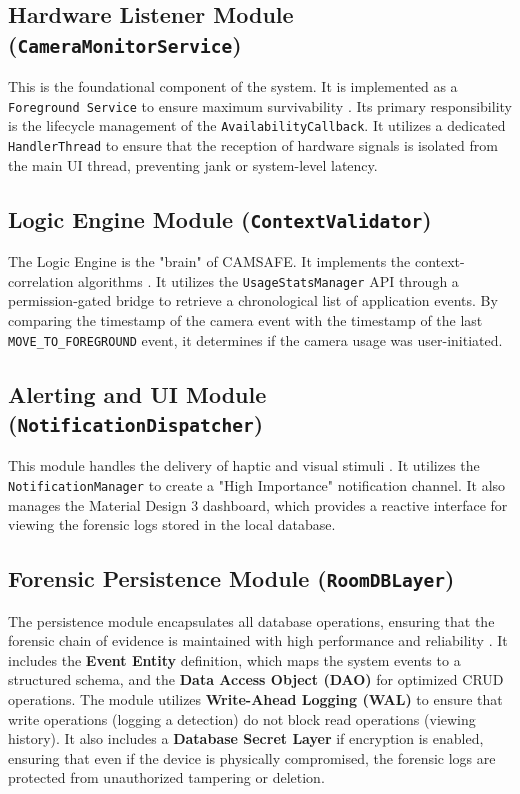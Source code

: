 \documentclass[12pt,a4paper]{report}
\begin{document}
\begin{enumerate}
    \subsection{Hardware Listener Module (\texttt{CameraMonitorService})}
    This is the foundational component of the system. It is implemented as a \texttt{Foreground Service} to ensure maximum survivability \cite{androidhal}. Its primary responsibility is the lifecycle management of the \texttt{AvailabilityCallback}. It utilizes a dedicated \texttt{HandlerThread} to ensure that the reception of hardware signals is isolated from the main UI thread, preventing jank or system-level latency.

    \subsection{Logic Engine Module (\texttt{ContextValidator})}
    The Logic Engine is the "brain" of CAMSAFE. It implements the context-correlation algorithms \cite{contextaware}. It utilizes the \texttt{UsageStatsManager} API through a permission-gated bridge to retrieve a chronological list of application events. By comparing the timestamp of the camera event with the timestamp of the last \texttt{MOVE\_TO\_FOREGROUND} event, it determines if the camera usage was user-initiated.

    \subsection{Alerting and UI Module (\texttt{NotificationDispatcher})}
    This module handles the delivery of haptic and visual stimuli \cite{privacydot}. It utilizes the \texttt{NotificationManager} to create a "High Importance" notification channel. It also manages the Material Design 3 dashboard, which provides a reactive interface for viewing the forensic logs stored in the local database.

    \subsection{Forensic Persistence Module (\texttt{RoomDBLayer})}
    The persistence module encapsulates all database operations, ensuring that the forensic chain of evidence is maintained with high performance and reliability \cite{smarthome}. It includes the \textbf{Event Entity} definition, which maps the system events to a structured schema, and the \textbf{Data Access Object (DAO)} for optimized CRUD operations. The module utilizes \textbf{Write-Ahead Logging (WAL)} to ensure that write operations (logging a detection) do not block read operations (viewing history). It also includes a \textbf{Database Secret Layer} if encryption is enabled, ensuring that even if the device is physically compromised, the forensic logs are protected from unauthorized tampering or deletion.


\end{enumerate}
\end{document}
